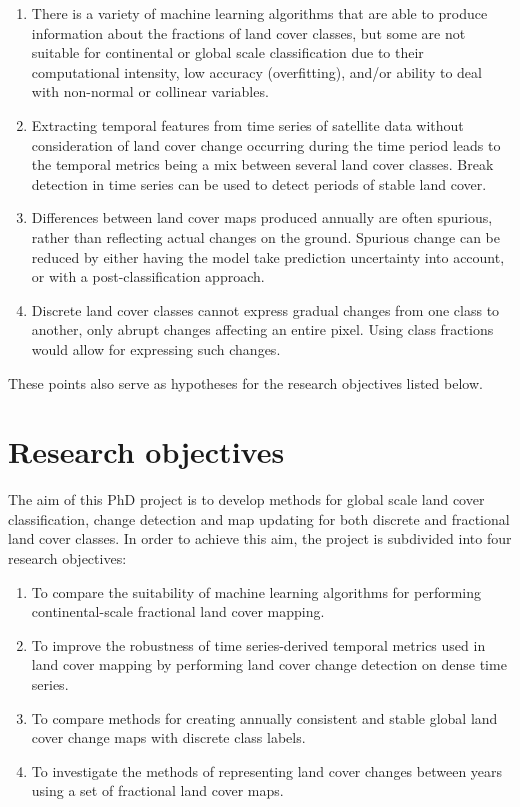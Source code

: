 \documentclass[10pt]{article}
\begin{document}
\begin{mdframed}[style=table,frametitle=\textbf{7. DETAILED DESCRIPTION OF THE RESEARCH PLAN} (max. 2500 words + 1 page literature list)]
\begin{enumerate}
 \item There is a variety of machine learning algorithms that are able to produce information about the fractions of land cover classes, but some are not suitable for continental or global scale classification due to their computational intensity, low accuracy (overfitting), and/or ability to deal with non-normal or collinear variables.
 \item Extracting temporal features from time series of satellite data without consideration of land cover change occurring during the time period leads to the temporal metrics being a mix between several land cover classes. Break detection in time series can be used to detect periods of stable land cover.
 \item Differences between land cover maps produced annually are often spurious, rather than reflecting actual changes on the ground. Spurious change can be reduced by either having the model take prediction uncertainty into account, or with a post-classification approach.
 \item Discrete land cover classes cannot express gradual changes from one class to another, only abrupt changes affecting an entire pixel. Using class fractions would allow for expressing such changes.
\end{enumerate}

These points also serve as hypotheses for the research objectives listed below.

\section{Research objectives}

The aim of this PhD project is to develop methods for global scale land cover classification, change detection and map updating for both discrete and fractional land cover classes. In order to achieve this aim, the project is subdivided into four research objectives:

\begin{enumerate}[label=RO\arabic*]
 \item \label{RO1} To compare the suitability of machine learning algorithms for performing continental-scale fractional land cover mapping.
 \item \label{RO2} To improve the robustness of time series-derived temporal metrics used in land cover mapping by performing land cover change detection on dense time series.
 \item \label{RO3} To compare methods for creating annually consistent and stable global land cover change maps with discrete class labels. %
 \item \label{RO4} To investigate the methods of representing land cover changes between years using a set of fractional land cover maps.
\end{enumerate}


\end{mdframed}
\end{document}
